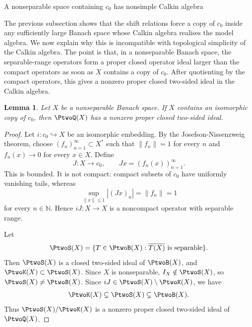 \documentclass[11pt,reqno]{amsart}
\makeatletter
\theoremstyle{plain}
\newtheorem{lemma}[lemma]{Lemma}
\theoremstyle{definition}
\newcommand{\N}{\mathbb N}
\newcounter{problempaper}
\newenvironment{problempaperbody}{%
  \setcounter{subsection}{0}%
  \setcounter{subsubsection}{0}%
  \setcounter{paragraph}{0}%
  \renewcommand{\thesubsection}{\arabic{subsection}}%
  \renewcommand{\thesubsubsection}{\thesubsection.\arabic{subsubsection}}%
  \renewcommand{\theparagraph}{\thesubsubsection.\arabic{paragraph}}%
  \let\problem@outersection\section
  \let\problem@outersubsection\subsection
  \let\problem@outersubsubsection\subsubsection
  \let\problem@outerparagraph\paragraph
  \let\section\problem@papersection
  \let\subsection\problem@papersubsection
  \let\subsubsection\problem@papersubsubsection
}{%
  \let\section\problem@outersection
  \let\subsection\problem@outersubsection
  \let\subsubsection\problem@outersubsubsection
  \let\paragraph\problem@outerparagraph
}
\newcommand{\problem@target}[2]{%
  \hypertarget{problem-\theproblempaper-#1-#2}{}%
}
\newcommand{\problem@paperheading}[3]{%
  \par\bigskip
  \problem@target{#1}{#2}%
  \noindent{\large\bfseries #2.\quad #3\par}%
  \nobreak\smallskip
}
\newcommand{\problem@papersubheading}[3]{%
  \par\medskip
  \problem@target{#1}{#2}%
  \noindent{\normalsize\bfseries #2.\quad #3\par}%
  \nobreak\smallskip
}
\newcommand{\problem@papersubsubheading}[3]{%
  \par\smallskip
  \problem@target{#1}{#2}%
  \noindent{\normalsize\itshape #2.\quad #3.\ }%
}
\def\problem@papersection{%
  \@ifstar{\problem@papersectionstar}{\problem@papersectionnostar}%
}
\def\problem@papersectionstar#1{%
  \par\bigskip\noindent{\large\bfseries #1\par}\nobreak\smallskip
}
\def\problem@papersectionnostar#1{%
  \refstepcounter{subsection}%
  \setcounter{subsubsection}{0}%
  \setcounter{paragraph}{0}%
  \problem@paperheading{section}{\thesubsection}{#1}%
  \problem@writecontentsline{section}{\thesubsection}{#1}%
}
\def\problem@papersubsection{%
  \@ifstar{\problem@papersubsectionstar}{\problem@papersubsectionnostar}%
}
\def\problem@papersubsectionstar#1{%
  \par\medskip\noindent{\normalsize\bfseries #1\par}\nobreak\smallskip
}
\def\problem@papersubsectionnostar#1{%
  \refstepcounter{subsubsection}%
  \setcounter{paragraph}{0}%
  \problem@papersubheading{subsection}{\thesubsubsection}{#1}%
  \problem@writecontentsline{subsection}{\thesubsubsection}{#1}%
}
\def\problem@papersubsubsection{%
  \@ifstar{\problem@papersubsubsectionstar}{\problem@papersubsubsectionnostar}%
}
\def\problem@papersubsubsectionstar#1{%
  \par\smallskip\noindent{\normalsize\itshape #1.\ }%
}
\def\problem@papersubsubsectionnostar#1{%
  \refstepcounter{paragraph}%
  \problem@papersubsubheading{subsubsection}{\theparagraph}{#1}%
  \problem@writecontentsline{subsubsection}{\theparagraph}{#1}%
}
\newcommand{\problem@writecontentsline}[3]{%
  \begingroup
  \protected@write\@auxout{}{%
    \string\problemcontentsentry{\theproblempaper}{#1}{#2}{#3}{\thepage}%
  }%
  \endgroup
}
\newcommand{\problemcontentsentry}[5]{%
  \@ifundefined{problemcontents@#1}{%
    \expandafter\gdef\csname problemcontents@#1\endcsname{}%
  }{}%
  \expandafter\g@addto@macro\csname problemcontents@#1\endcsname{%
    \problemcontentsline{#1}{#2}{#3}{#4}{#5}%
  }%
}
\newcommand{\problemcontentslink}[4]{%
  \hyperlink{problem-#1-#2-#3}{#4}%
}
\newcommand{\problemcontentsline}[5]{%
  \ifstrequal{#2}{section}{%
    \par\noindent
    \problemcontentslink{#1}{#2}{#3}{\makebox[2.5em][l]{#3}#4}%
    \nobreak\dotfill
    \problemcontentslink{#1}{#2}{#3}{#5}\par
  }{%
    \ifstrequal{#2}{subsection}{%
      \par\noindent\hspace*{1.5em}%
      \problemcontentslink{#1}{#2}{#3}{\makebox[3.5em][l]{#3}#4}%
      \nobreak\dotfill
      \problemcontentslink{#1}{#2}{#3}{#5}\par
    }{%
      \par\noindent\hspace*{3em}%
      \problemcontentslink{#1}{#2}{#3}{\makebox[4.5em][l]{#3}#4}%
      \nobreak\dotfill
      \problemcontentslink{#1}{#2}{#3}{#5}\par
    }%
  }%
}
\makeatother
\begin{document}
\begin{problempaperbody}
\subsection{A nonseparable space containing $c_0$ has nonsimple Calkin algebra}
\label{p2-second:sec:c0-destroys-simplicity}

The previous subsection shows that the shift relations force a copy of $c_0$ inside any sufficiently large Banach space whose Calkin algebra realises the model algebra. We now explain why this is incompatible with topological simplicity of the Calkin algebra. The point is that, in a nonseparable Banach space, the separable-range operators form a proper closed operator ideal larger than the compact operators as soon as $X$ contains a copy of $c_0$. After quotienting by the compact operators, this gives a nonzero proper closed two-sided ideal in the Calkin algebra.

\begin{lemma}
\label{p2-second:lem:c0-destroys-simplicity}
Let $X$ be a nonseparable Banach space. If $X$ contains an isomorphic copy of $c_0$, then $\PtwoQ(X)$ has a nonzero proper closed two-sided ideal.
\end{lemma}

\begin{proof}
Let $i:c_0\hookrightarrow X$ be an isomorphic embedding. By the Josefson-Nissenzweig theorem, choose $(f_n)_{n=1}^{\infty}\subset X^*$ such that $\|f_n\|=1$ for every $n$ and $f_n(x)\to0$ for every $x\in X$. Define
\begin{equation*}
        J:X\to c_0,\qquad Jx=(f_n(x))_{n=1}^{\infty}.
\end{equation*}
This is bounded. It is not compact: compact subsets of $c_0$ have uniformly vanishing tails, whereas
\begin{equation*}
        \sup_{\|x\|\leq1}|(Jx)_n|=\|f_n\|=1
\end{equation*}
for every $n\in\N$. Hence $iJ:X\to X$ is a noncompact operator with separable range.

Let
\begin{equation*}
        \PtwoS(X)=\{T\in\PtwoB(X):\overline{T(X)}\text{ is separable}\}.
\end{equation*}
Then $\PtwoS(X)$ is a closed two-sided ideal of $\PtwoB(X)$, and $\PtwoK(X)\subset\PtwoS(X)$. Since $X$ is nonseparable, $I_X\notin\PtwoS(X)$, so $\PtwoS(X)\ne\PtwoB(X)$. Since $iJ\in\PtwoS(X)\setminus\PtwoK(X)$, we have
\begin{equation*}
        \PtwoK(X)\subsetneq\PtwoS(X)\subsetneq\PtwoB(X).
\end{equation*}
Thus $\PtwoS(X)/\PtwoK(X)$ is a nonzero proper closed two-sided ideal of $\PtwoQ(X)$.
\end{proof}


\end{problempaperbody}
\end{document}
